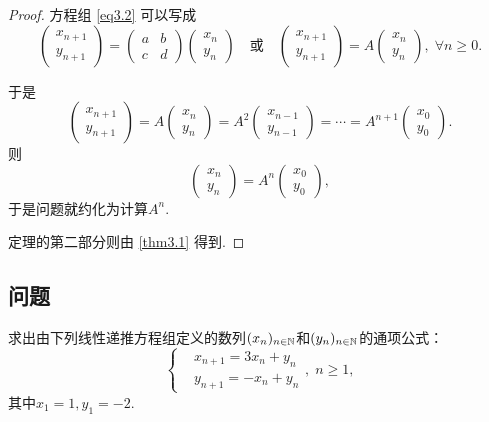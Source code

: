 \begin{proof}
  方程组 \eqref{eq3.2} 可以写成
  \[
    \begin{pmatrix}
      x_{n+1} \\ y_{n+1}
    \end{pmatrix} = \begin{pmatrix}
      a & b \\
      c & d
    \end{pmatrix}\begin{pmatrix}
      x_n \\ y_n
    \end{pmatrix}\quad \text{或} \quad
    \begin{pmatrix}
      x_{n+1} \\ y_{n+1}
    \end{pmatrix} = A\begin{pmatrix}
      x_n \\ y_n
    \end{pmatrix},\; \forall n\ge0.
  \]

  于是
  \[
    \begin{pmatrix}
      x_{n+1} \\ y_{n+1}
    \end{pmatrix} = A \begin{pmatrix}
      x_n \\ y_n
    \end{pmatrix} = A^2 \begin{pmatrix}
      x_{n-1} \\ y_{n-1}
    \end{pmatrix} = \cdots =
    A^{n+1} \begin{pmatrix}
      x_0 \\ y_0
    \end{pmatrix}.
  \]
  则
  \[
    \begin{pmatrix}
      x_n \\ y_n
    \end{pmatrix} = A^n
    \begin{pmatrix}
      x_0 \\ y_0
    \end{pmatrix},
  \]
  于是问题就约化为计算$A^n$.

  定理的第二部分则由 \ref{thm3.1} 得到.
\end{proof}

\subsection{问题}
\begin{problem}
  求出由下列线性递推方程组定义的数列$(x_n)_{n\in\mathbb N}$和$(y_n)_{n\in\mathbb N}$的通项公式：
  \[
    \left\{
      \begin{aligned}
        & x_{n+1} = 3x_n + y_n \\
        & y_{n+1} = -x_n + y_n
      \end{aligned}
    \right.,\; n\ge1,
  \]
  其中$x_1=1,y_1=-2$.
\end{problem}

